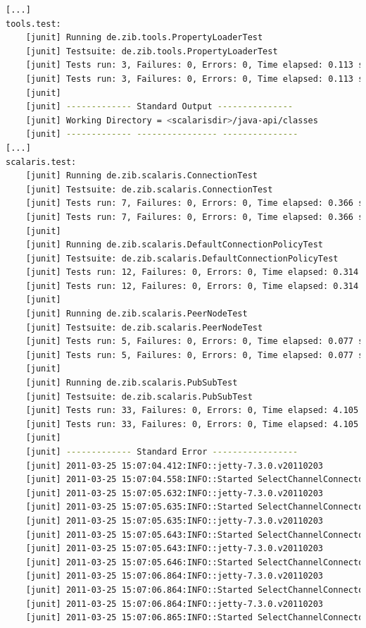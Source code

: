 \documentclass[a4paper]{scrreprt}
\begin{document}
\begin{lstlisting}[language=sh]
%> make java-test
[...]
tools.test:
    [junit] Running de.zib.tools.PropertyLoaderTest
    [junit] Testsuite: de.zib.tools.PropertyLoaderTest
    [junit] Tests run: 3, Failures: 0, Errors: 0, Time elapsed: 0.113 sec
    [junit] Tests run: 3, Failures: 0, Errors: 0, Time elapsed: 0.113 sec
    [junit] 
    [junit] ------------- Standard Output ---------------
    [junit] Working Directory = <scalarisdir>/java-api/classes
    [junit] ------------- ---------------- ---------------
[...]
scalaris.test:
    [junit] Running de.zib.scalaris.ConnectionTest
    [junit] Testsuite: de.zib.scalaris.ConnectionTest
    [junit] Tests run: 7, Failures: 0, Errors: 0, Time elapsed: 0.366 sec
    [junit] Tests run: 7, Failures: 0, Errors: 0, Time elapsed: 0.366 sec
    [junit] 
    [junit] Running de.zib.scalaris.DefaultConnectionPolicyTest
    [junit] Testsuite: de.zib.scalaris.DefaultConnectionPolicyTest
    [junit] Tests run: 12, Failures: 0, Errors: 0, Time elapsed: 0.314 sec
    [junit] Tests run: 12, Failures: 0, Errors: 0, Time elapsed: 0.314 sec
    [junit] 
    [junit] Running de.zib.scalaris.PeerNodeTest
    [junit] Testsuite: de.zib.scalaris.PeerNodeTest
    [junit] Tests run: 5, Failures: 0, Errors: 0, Time elapsed: 0.077 sec
    [junit] Tests run: 5, Failures: 0, Errors: 0, Time elapsed: 0.077 sec
    [junit] 
    [junit] Running de.zib.scalaris.PubSubTest
    [junit] Testsuite: de.zib.scalaris.PubSubTest
    [junit] Tests run: 33, Failures: 0, Errors: 0, Time elapsed: 4.105 sec
    [junit] Tests run: 33, Failures: 0, Errors: 0, Time elapsed: 4.105 sec
    [junit] 
    [junit] ------------- Standard Error -----------------
    [junit] 2011-03-25 15:07:04.412:INFO::jetty-7.3.0.v20110203
    [junit] 2011-03-25 15:07:04.558:INFO::Started SelectChannelConnector@127.0.0.1:59235
    [junit] 2011-03-25 15:07:05.632:INFO::jetty-7.3.0.v20110203
    [junit] 2011-03-25 15:07:05.635:INFO::Started SelectChannelConnector@127.0.0.1:41335
    [junit] 2011-03-25 15:07:05.635:INFO::jetty-7.3.0.v20110203
    [junit] 2011-03-25 15:07:05.643:INFO::Started SelectChannelConnector@127.0.0.1:38552
    [junit] 2011-03-25 15:07:05.643:INFO::jetty-7.3.0.v20110203
    [junit] 2011-03-25 15:07:05.646:INFO::Started SelectChannelConnector@127.0.0.1:34704
    [junit] 2011-03-25 15:07:06.864:INFO::jetty-7.3.0.v20110203
    [junit] 2011-03-25 15:07:06.864:INFO::Started SelectChannelConnector@127.0.0.1:57898
    [junit] 2011-03-25 15:07:06.864:INFO::jetty-7.3.0.v20110203
    [junit] 2011-03-25 15:07:06.865:INFO::Started SelectChannelConnector@127.0.0.1:47949

\end{lstlisting}
\end{document}

